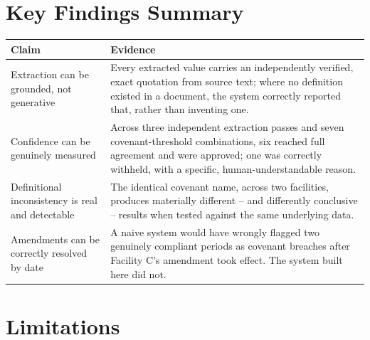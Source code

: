 \documentclass[11pt,a4paper]{article}
\begin{document}
\newpage
\section{Key Findings Summary}

\begin{center}
\renewcommand{\arraystretch}{1.4}
\begin{tabular}{@{}p{4.3cm}p{9.7cm}@{}}
\toprule
\textbf{Claim} & \textbf{Evidence} \\
\midrule
Extraction can be grounded, not generative & Every extracted value carries an independently verified, exact quotation from source text; where no definition existed in a document, the system correctly reported that, rather than inventing one. \\
\addlinespace
Confidence can be genuinely measured & Across three independent extraction passes and seven covenant-threshold combinations, six reached full agreement and were approved; one was correctly withheld, with a specific, human-understandable reason. \\
\addlinespace
Definitional inconsistency is real and detectable & The identical covenant name, across two facilities, produces materially different -- and differently conclusive -- results when tested against the same underlying data. \\
\addlinespace
Amendments can be correctly resolved by date & A naive system would have wrongly flagged two genuinely compliant periods as covenant breaches after Facility C's amendment took effect. The system built here did not. \\
\bottomrule
\end{tabular}
\end{center}

\newpage
\section{Limitations}
\end{document}
